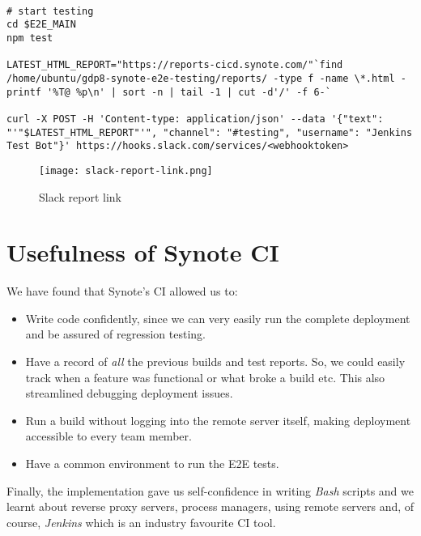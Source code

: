 \begin{listing}[H]
\begin{verbatim}

# start testing
cd $E2E_MAIN
npm test

LATEST_HTML_REPORT="https://reports-cicd.synote.com/"`find /home/ubuntu/gdp8-synote-e2e-testing/reports/ -type f -name \*.html -printf '%T@ %p\n' | sort -n | tail -1 | cut -d'/' -f 6-`

curl -X POST -H 'Content-type: application/json' --data '{"text": "'"$LATEST_HTML_REPORT"'", "channel": "#testing", "username": "Jenkins Test Bot"}' https://hooks.slack.com/services/<webhooktoken>

\end{verbatim}
\label{lst:run-e2e-tests}
\end{listing}

\begin{figure}[!hbt]
  	\centering
 	\texttt{[image: slack-report-link.png]}
  	\caption{Slack report link}
 	\label{fig:slack-report-link}
\end{figure}

\vspace{1cm}

\section{Usefulness of Synote CI}
\label{sec:usefulness-of-synote-ci}

We have found that Synote's CI allowed us to:

\begin{itemize}

  \item Write code confidently, since we can very easily run the complete deployment and be assured of regression testing.

  \item Have a record of \textit{all} the previous builds and test reports. So, we could easily track when a feature was functional or what broke a build etc. This also streamlined debugging deployment issues.

  \item Run a build without logging into the remote server itself, making deployment accessible to every team member.

  \item Have a common environment to run the E2E tests.

\end{itemize}

Finally, the implementation gave us self-confidence in writing \textit{Bash} scripts and we learnt about reverse proxy servers, process managers, using remote servers and, of course, \textit{Jenkins} which is an industry favourite CI tool.
